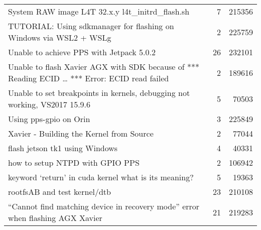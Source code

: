 \begin{longtable}{p{}rr}
    System RAW image L4T 32.x.y l4t\_initrd\_flash.sh                                                   & 7        & 215356 \\
    TUTORIAL: Using sdkmanager for flashing on Windows via WSL2 + WSLg                                  & 2        & 225759 \\
    Unable to achieve PPS with Jetpack 5.0.2                                                            & 26       & 232101 \\
    Unable to flash Xavier AGX with SDK because of *** Reading ECID … *** Error: ECID read failed       & 2        & 189616 \\
    Unable to set breakpoints in kernels, debugging not working, VS2017 15.9.6                          & 5        & 70503  \\
    Using pps-gpio on Orin                                                                              & 3        & 225849 \\
    Xavier - Building the Kernel from Source                                                            & 2        & 77044  \\
    flash jetson tk1 using Windows                                                                      & 4        & 40331  \\
    how to setup NTPD with GPIO PPS                                                                     & 2        & 106942 \\
    keyword ‘return’ in cuda kernel what is its meaning?                                                & 5        & 19363  \\
    rootfsAB and test kernel/dtb                                                                        & 23       & 210108 \\
    “Cannot find matching device in recovery mode” error when flashing AGX Xavier                       & 21       & 219283
\end{longtable}


